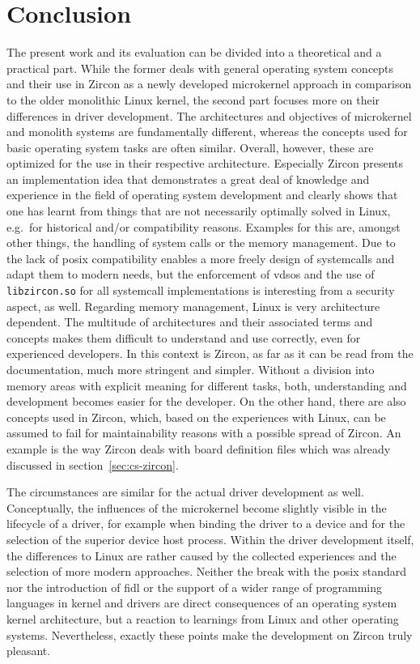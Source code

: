 
\chapter{Conclusion}\label{ch:conclusion}
The present work and its evaluation can be divided into a theoretical and a practical part.
While the former deals with general operating system concepts and their use in Zircon as a newly developed microkernel approach in comparison to the older monolithic Linux kernel, the second part focuses more on their differences in driver development.
The architectures and objectives of microkernel and monolith systems are fundamentally different, whereas the concepts used for basic operating system tasks are often similar.
Overall, however, these are optimized for the use in their respective architecture.
Especially Zircon presents an implementation idea that demonstrates a great deal of knowledge and experience in the field of operating system development and clearly shows that one has learnt from things that are not necessarily optimally solved in Linux, e.g.\ for historical and/or compatibility reasons.
Examples for this are, amongst other things, the handling of system calls or the memory management.
Due to the lack of \ac{posix} compatibility enables a more freely design of systemcalls and adapt them to modern needs, but the enforcement of \acp{vdso} and the use of \texttt{libzircon.so} for all systemcall implementations is interesting from a security aspect, as well.
Regarding memory management, Linux is very architecture dependent.
The multitude of architectures and their associated terms and concepts makes them difficult to understand and use correctly, even for experienced developers.
In this context is Zircon, as far as it can be read from the documentation, much more stringent and simpler.
Without a division into memory areas with explicit meaning for different tasks, both, understanding and development becomes easier for the developer.
On the other hand, there are also concepts used in Zircon, which, based on the experiences with Linux, can be assumed to fail for maintainability reasons with a possible spread of Zircon.
An example is the way Zircon deals with board definition files which was already discussed in section~\ref{sec:cs-zircon}.

The circumstances are similar for the actual driver development as well.
Conceptually, the influences of the microkernel become slightly visible in the lifecycle of a driver, for example when binding the driver to a device and for the selection of the superior device host process.
Within the driver development itself, the differences to Linux are rather caused by the collected experiences and the selection of more modern approaches.
Neither the break with the \ac{posix} standard nor the introduction of \ac{fidl} or the support of a wider range of programming languages in kernel and drivers are direct consequences of an operating system kernel architecture, but a reaction to learnings from Linux and other operating systems.
Nevertheless, exactly these points make the development on Zircon truly pleasant.

